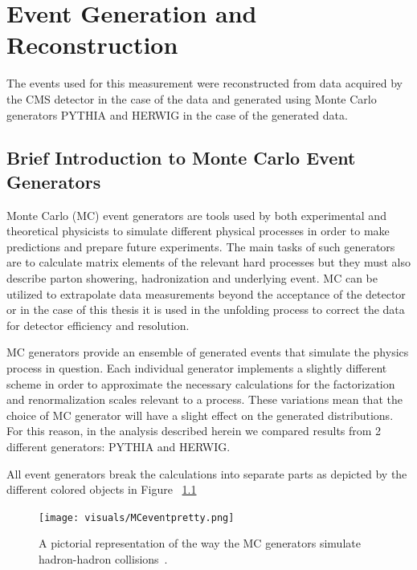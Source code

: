 \chapter{Event Generation and Reconstruction}\label{chap:MCGenReco}


The events used for this measurement were reconstructed from data acquired by the CMS detector in the case of the data and generated using Monte Carlo generators PYTHIA and HERWIG in the case of the generated data.

\section{Brief Introduction to Monte Carlo Event Generators}\label{secMCGen}

Monte Carlo (MC) event generators are tools used by both experimental and theoretical physicists to simulate different physical processes in order to make predictions and prepare future experiments. The main tasks of such generators are to calculate matrix elements of the relevant hard processes but they must also describe parton showering, hadronization and underlying event. MC can be utilized to extrapolate data measurements beyond the acceptance of the detector or in the case of this thesis it is used in the unfolding process to correct the data for detector efficiency and resolution.


MC generators provide an ensemble of generated events that simulate the physics process in question. Each individual generator implements a slightly different scheme in order to approximate the necessary calculations for the factorization and renormalization scales relevant to a process. These variations mean that the choice of MC generator will have a slight effect on the generated distributions. For this reason, in the analysis described herein we compared results from 2 different generators: PYTHIA and HERWIG.



All event generators break the calculations into separate parts as depicted by the different colored objects in Figure ~\ref{fig:MCeventpretty}  


\begin{figure}[htb]
\centering
\texttt{[image: visuals/MCeventpretty.png]}
\caption{A pictorial representation of the way the MC generators simulate hadron-hadron collisions~\cite{Hoche:2014rga}.}
\label{fig:MCeventpretty}
\end{figure}





